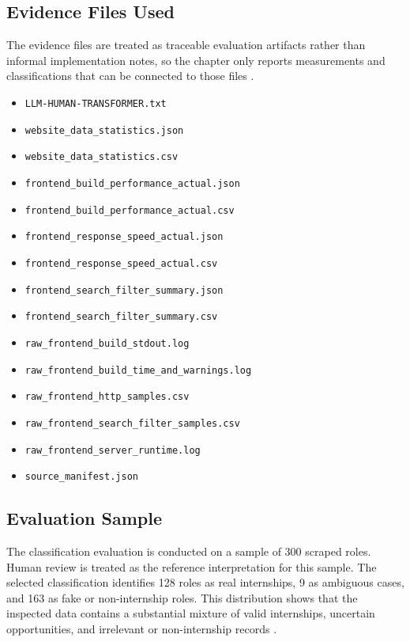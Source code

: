 \subsection{Evidence Files Used}

The evidence files are treated as traceable evaluation artifacts rather than informal implementation notes, so the chapter only reports measurements and classifications that can be connected to those files \cite{wohlin2012experimentation, jain1991art}.

\begin{itemize}
    \item \texttt{LLM-HUMAN-TRANSFORMER.txt}
    \item \texttt{website\_data\_statistics.json}
    \item \texttt{website\_data\_statistics.csv}
    \item \texttt{frontend\_build\_performance\_actual.json}
    \item \texttt{frontend\_build\_performance\_actual.csv}
    \item \texttt{frontend\_response\_speed\_actual.json}
    \item \texttt{frontend\_response\_speed\_actual.csv}
    \item \texttt{frontend\_search\_filter\_summary.json}
    \item \texttt{frontend\_search\_filter\_summary.csv}
    \item \texttt{raw\_frontend\_build\_stdout.log}
    \item \texttt{raw\_frontend\_build\_time\_and\_warnings.log}
    \item \texttt{raw\_frontend\_http\_samples.csv}
    \item \texttt{raw\_frontend\_search\_filter\_samples.csv}
    \item \texttt{raw\_frontend\_server\_runtime.log}
    \item \texttt{source\_manifest.json}
\end{itemize}

\subsection{Evaluation Sample}

The classification evaluation is conducted on a sample of 300 scraped roles. Human review is treated as
the reference interpretation for this sample. The selected classification identifies 128 roles as real
internships, 9 as ambiguous cases, and 163 as fake or non-internship roles. This distribution shows that the
inspected data contains a substantial mixture of valid internships, uncertain opportunities, and irrelevant or
non-internship records \cite{krippendorff2004content, wohlin2012experimentation}.

